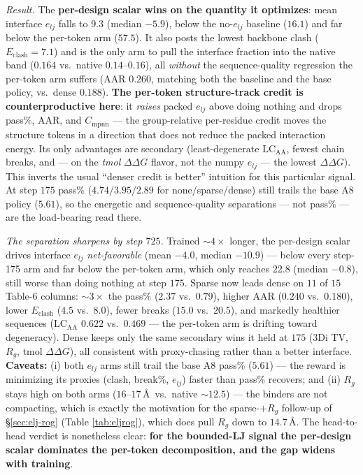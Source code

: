 \documentclass[11pt]{article}
\begin{document}
\emph{Result.} The \textbf{per-design scalar wins on the quantity it optimizes}: mean interface
$e_{lj}$ falls to $9.3$ (median $-5.9$), below the no-$e_{lj}$ baseline ($16.1$) and far below the
per-token arm ($57.5$). It also posts the lowest backbone clash ($E_{\mathrm{clash}}=7.1$) and is the
only arm to pull the interface fraction into the native band ($0.164$ vs.\ native $0.14$--$0.16$), all
\emph{without} the sequence-quality regression the per-token arm suffers (AAR $0.260$, matching both
the baseline and the base policy, vs.\ dense $0.188$). \textbf{The per-token structure-track credit is
counterproductive here}: it \emph{raises} packed $e_{lj}$ above doing nothing and drops pass\%, AAR,
and $C_{\mathrm{mpnn}}$ --- the group-relative per-residue credit moves the structure tokens in a
direction that does not reduce the packed interaction energy. Its only advantages are secondary
(least-degenerate $\mathrm{LC}_{\mathrm{AA}}$, fewest chain breaks, and --- on the \emph{tmol}
$\Delta\Delta G$ flavor, not the numpy $e_{lj}$ --- the lowest $\Delta\Delta G$). This inverts the
usual ``denser credit is better'' intuition for this particular signal. At step $175$ pass\%
($4.74/3.95/2.89$ for none/sparse/dense) still trails the base A8 policy ($5.61$), so the energetic
and sequence-quality separations --- not pass\% --- are the load-bearing read there.

\emph{The separation sharpens by step $725$.} Trained $\sim\!4\times$ longer, the per-design scalar
drives interface $e_{lj}$ \emph{net-favorable} (mean $-4.0$, median $-10.9$) --- below every step-175
arm and far below the per-token arm, which only reaches $22.8$ (median $-0.8$), still worse than doing
nothing at step $175$. Sparse now leads dense on $11$ of $15$ Table-6 columns: $\sim\!3\times$ the pass\%
($2.37$ vs.\ $0.79$), higher AAR ($0.240$ vs.\ $0.180$), lower $E_{\mathrm{clash}}$ ($4.5$ vs.\ $8.0$),
fewer breaks ($15.0$ vs.\ $20.5$), and markedly healthier sequences ($\mathrm{LC}_{\mathrm{AA}}$ $0.622$
vs.\ $0.469$ --- the per-token arm is drifting toward degeneracy). Dense keeps only the same secondary
wins it held at $175$ ($3$Di TV, $R_g$, tmol $\Delta\Delta G$), all consistent with proxy-chasing rather
than a better interface. \textbf{Caveats:} (i) both $e_{lj}$ arms still trail the base A8 pass\%
($5.61$) --- the reward is minimizing its proxies (clash, break\%, $e_{lj}$) faster than pass\% recovers;
and (ii) $R_g$ stays high on both arms ($16$--$17$\,\AA\ vs.\ native $\sim\!12.5$) --- the binders are
not compacting, which is exactly the motivation for the sparse-$+R_g$ follow-up of \S\ref{sec:elj-rog}
(Table \ref{tab:eljrog}), which does pull $R_g$ down to $14.7$\,\AA.
The head-to-head verdict is nonetheless clear: \textbf{for the bounded-LJ signal the per-design scalar
dominates the per-token decomposition, and the gap widens with training}.
\end{document}
